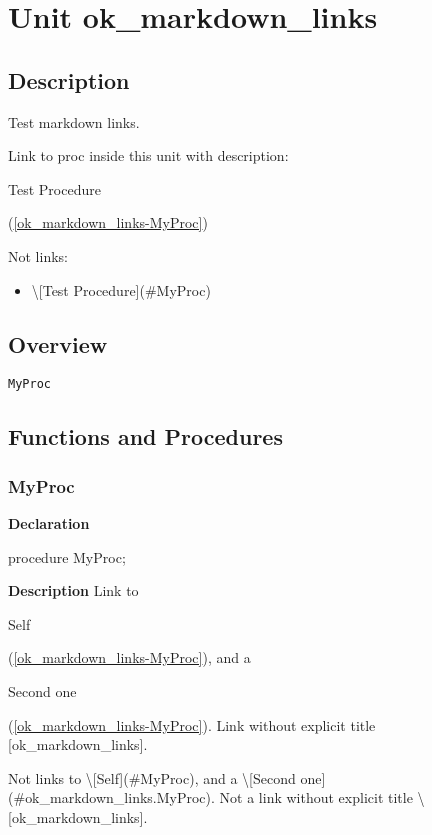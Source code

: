\documentclass{report}
\begin{document}
\newlength{\tmplength}
\chapter{Unit ok{\_}markdown{\_}links}
\section{Description}
Test markdown links.\hfill\vspace*{1ex}



Link to proc inside this unit with description: \begin{ttfamily}Test Procedure\end{ttfamily}(\ref{ok_markdown_links-MyProc})

Not links:

\begin{itemize}
\item {\textbackslash}[Test Procedure]({\#}MyProc)
\end{itemize}
\section{Overview}
\begin{description}
\item[\texttt{MyProc}]
\end{description}
\section{Functions and Procedures}
\subsection*{MyProc}
\begin{list}{}{
\setlength{\itemindent}{0cm}
\setlength{\listparindent}{0cm}
\setlength{\leftmargin}{\evensidemargin}
\addtolength{\leftmargin}{\tmplength}
\settowidth{\labelsep}{X}
\addtolength{\leftmargin}{\labelsep}
\setlength{\labelwidth}{\tmplength}
}
\begin{flushleft}
\item[\textbf{Declaration}\hfill]
\begin{ttfamily}
procedure MyProc;\end{ttfamily}


\end{flushleft}
\par
\item[\textbf{Description}]
Link to \begin{ttfamily}Self\end{ttfamily}(\ref{ok_markdown_links-MyProc}), and a \begin{ttfamily}Second one\end{ttfamily}(\ref{ok_markdown_links-MyProc}). Link without explicit title [ok{\_}markdown{\_}links].

Not links to {\textbackslash}[Self]({\#}MyProc), and a {\textbackslash}[Second one]({\#}ok{\_}markdown{\_}links.MyProc). Not a link without explicit title {\textbackslash}[ok{\_}markdown{\_}links].

\end{list}
\end{document}
